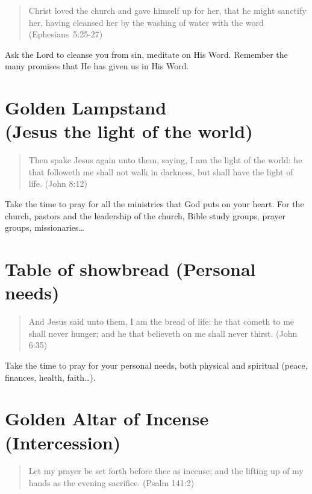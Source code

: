 \begin{quote}
Christ loved the church and gave himself up for her, that he might sanctify her, having cleansed her by the washing of water with the word  (Ephesians~5:25-27)
\end{quote}

Ask the Lord to cleanse you from sin, meditate on His Word. Remember the many promises that He has given us in His Word.



\section{Golden Lampstand\\(Jesus the light of the world)}


\begin{quote}
Then spake Jesus again unto them, saying, I am the light of the world: he that followeth me shall not walk in darkness, but shall have the light of life. (John 8:12)
\end{quote}

Take the time to pray for all the ministries that God puts on your heart.
For the church, pastors and the leadership of the church, Bible study groups,
prayer groups, missionaries\ldots{}


\section{Table of showbread (Personal needs)}

\begin{quote}
And Jesus said unto them, I am the bread of life: he that cometh to me shall never hunger; and he that believeth on me shall never thirst. (John 6:35)
\end{quote}

Take the time to pray for your personal needs, both physical and spiritual (peace, finances, health, faith\ldots{}).


\section{Golden Altar of Incense\\(Intercession)}

\begin{quote}
Let my prayer be set forth before thee as incense; and the lifting up of my hands as the evening sacrifice. (Psalm 141:2)
\end{quote}

